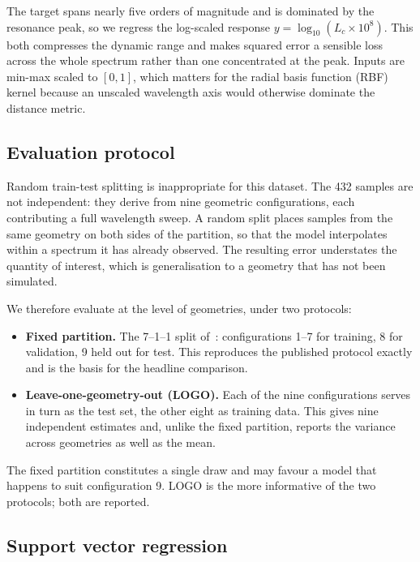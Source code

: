 \documentclass[iicol,pdflatex,sn-basic,Numbered]{sn-jnl}
\begin{document}
The target spans nearly five orders of magnitude and is dominated by the
resonance peak, so we regress the log-scaled response
$y = \log_{10}(L_c \times 10^{8})$. This both compresses the dynamic range and
makes squared error a sensible loss across the whole spectrum rather than one
concentrated at the peak. Inputs are min-max scaled to $[0,1]$, which matters for
the radial basis function (RBF) kernel because an unscaled wavelength axis would
otherwise dominate the distance metric.

\subsection{Evaluation protocol}\label{sec:protocol}

Random train-test splitting is inappropriate for this dataset. The 432 samples
are not independent: they derive from nine geometric configurations, each
contributing a full wavelength sweep. A random split places samples from the
same geometry on both sides of the partition, so that the model interpolates
within a spectrum it has already observed. The resulting error understates the
quantity of interest, which is generalisation to a geometry that has not been
simulated.

We therefore evaluate at the level of geometries, under two protocols:

\begin{itemize}
\item \textbf{Fixed partition.} The 7--1--1 split of~\cite{zelaci2021}:
configurations 1--7 for training, 8 for validation, 9 held out for test. This
reproduces the published protocol exactly and is the basis for the headline
comparison.
\item \textbf{Leave-one-geometry-out (LOGO).} Each of the nine configurations
serves in turn as the test set, the other eight as training data. This gives
nine independent estimates and, unlike the fixed partition, reports the variance
across geometries as well as the mean.
\end{itemize}

The fixed partition constitutes a single draw and may favour a model that happens
to suit configuration 9. LOGO is the more informative of the two protocols; both
are reported.

\subsection{Support vector regression}\label{sec:svr}
\end{document}
